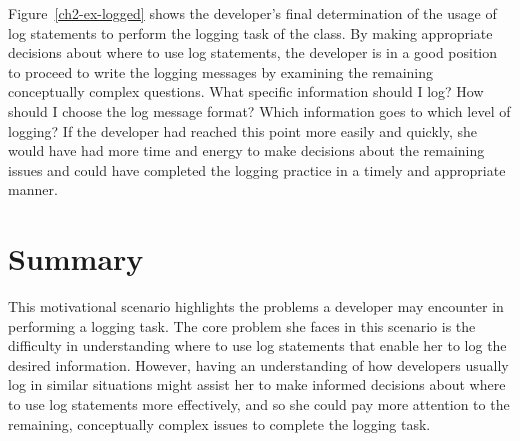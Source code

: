 Figure~\ref{ch2-ex-logged} shows the developer's final determination of the usage of log statements to perform the logging task of the  class. By making appropriate decisions about where to use log statements, the developer is in a good position to proceed to write the logging messages by examining the remaining conceptually complex questions. What specific information should I log? How should I choose the log message format? Which information goes to which level of logging? If the developer had reached this point more easily and quickly, she would have had more time and energy to make decisions about the remaining issues and could have completed the logging practice in a timely and appropriate manner.



\section{Summary}  \label{ch2-summary}

This motivational scenario highlights the problems a developer may encounter in performing a logging task. The core problem she faces in this scenario is the difficulty in understanding where to use log statements that enable her to log the desired information. However, having an understanding of how developers usually log in similar situations might assist her to make informed decisions about where to use log statements more effectively, and so she could pay more attention to the remaining, conceptually complex issues to complete the logging task.



